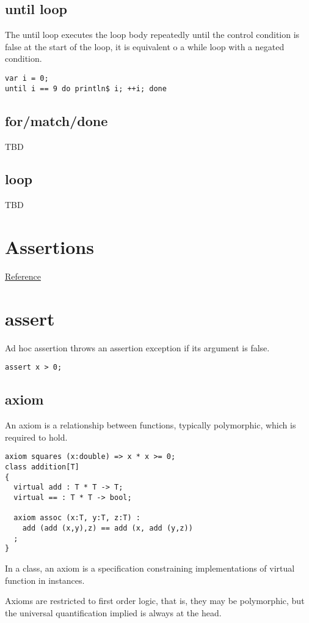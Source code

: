 \documentclass[oneside]{book}
\begin{document}
{\subsection{until loop}
The until loop executes the loop body repeatedly
until the control condition is false at the start of the loop,
it is equivalent o a while loop with a negated condition.

\begin{verbatim}
var i = 0;
until i == 9 do println$ i; ++i; done
\end{verbatim}


\subsection{for/match/done}
TBD
\subsection{loop}
TBD
\section{Assertions}
\href{http://felix-lang.org/share/lib/grammar/assertions.fsyn}{Reference}
\section{assert}
Ad hoc assertion throws an assertion exception if its argument
is false. 

\begin{verbatim}
assert x > 0;
\end{verbatim}


\subsection{axiom}
An axiom is a relationship between functions, typically
polymorphic, which is required to hold.

\begin{verbatim}
axiom squares (x:double) => x * x >= 0;
class addition[T]
{
  virtual add : T * T -> T;
  virtual == : T * T -> bool;

  axiom assoc (x:T, y:T, z:T) : 
    add (add (x,y),z) == add (x, add (y,z))
  ;
}
\end{verbatim}

In a class, an axiom is a specification constraining
implementations of virtual function in instances.

Axioms are restricted to first order logic, that is, they
may be polymorphic, but the universal quantification implied
is always at the head.

}
\end{document}
